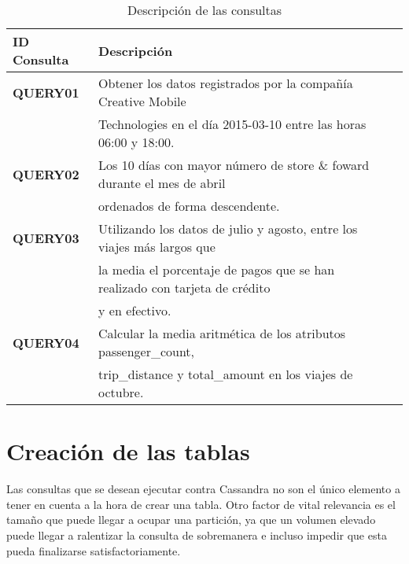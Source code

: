 \begin{table}[h!]
	\centering
	\begin{tabular}{|l|l|l|}
		
		\hline
		
		\textbf{ID Consulta} & \textbf{Descripción} \\
		
		\hline
		\hline
		
		\textbf{QUERY01} & Obtener los datos registrados por la compañía Creative Mobile \\ 
		                 & Technologies en el día 2015-03-10 entre las horas 06:00 y 18:00.\\
		
		\hline
		
		\textbf{QUERY02} & Los 10 días con mayor número de store \& foward durante el mes de abril \\ 
		                 & ordenados de forma descendente.\\ 
		
		\hline
		
		\textbf{QUERY03} & Utilizando los datos de julio y agosto, entre los viajes más largos que \\ 
		                 & la media el porcentaje de pagos que se han realizado con tarjeta de crédito \\
		                 & y en efectivo.\\
		
		\hline
		
		\textbf{QUERY04} & Calcular la media aritmética de los atributos passenger\_count,\\
		                 & trip\_distance y total\_amount en los viajes de octubre. \\
		
		\hline
		
	\end{tabular}
	\caption{Descripción de las consultas}
	\label{consultas_codigos}
\end{table}

\section{Creación de las tablas}

Las consultas que se desean ejecutar contra Cassandra no son el único elemento a tener en cuenta a la hora de crear una tabla. Otro factor de vital relevancia es el tamaño que puede llegar a ocupar una partición, ya que un volumen elevado puede llegar a ralentizar la consulta de sobremanera e incluso impedir que esta pueda finalizarse satisfactoriamente.\\

